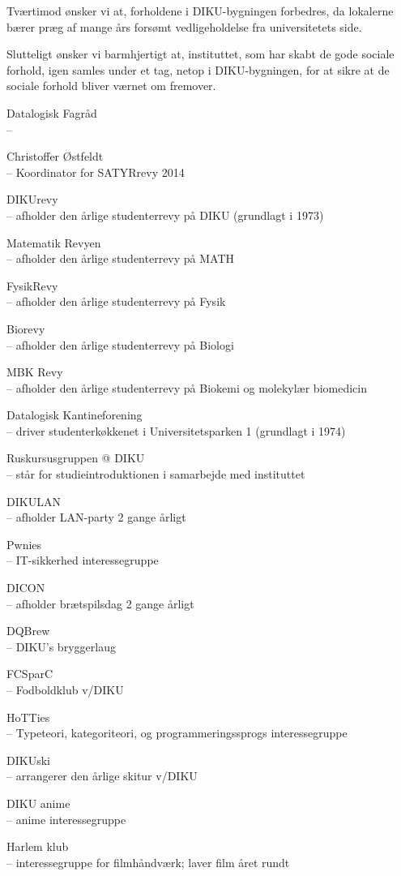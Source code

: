 \documentclass[a4paper]{article}
\begin{document}
Tværtimod ønsker vi at, forholdene i DIKU-bygningen forbedres, da
lokalerne bærer præg af mange års forsømt vedligeholdelse fra
universitetets side.

Slutteligt ønsker vi barmhjertigt at, instituttet, som har skabt de gode
sociale forhold, igen samles under et tag, netop i DIKU-bygningen, for at sikre
at de sociale forhold bliver værnet om fremover.

\begin{flushright}

\footnotesize\sffamily\itshape

Datalogisk Fagråd \\
--

Christoffer Østfeldt \\
-- Koordinator for SATYRrevy 2014

DIKUrevy \\
-- afholder den årlige studenterrevy på DIKU (grundlagt i 1973)

Matematik Revyen \\
-- afholder den årlige studenterrevy på MATH

FysikRevy \\
-- afholder den årlige studenterrevy på Fysik

Biorevy \\
-- afholder den årlige studenterrevy på Biologi

MBK Revy \\
-- afholder den årlige studenterrevy på Biokemi og molekylær biomedicin

Datalogisk Kantineforening \\
-- driver studenterkøkkenet i Universitetsparken 1 (grundlagt i 1974)

Ruskursusgruppen @ DIKU \\
-- står for studieintroduktionen i samarbejde med instituttet

DIKULAN \\
-- afholder LAN-party 2 gange årligt

Pwnies \\
-- IT-sikkerhed interessegruppe

DICON \\
-- afholder brætspilsdag 2 gange årligt

DQBrew \\
-- DIKU's bryggerlaug

FCSparC \\
-- Fodboldklub v/DIKU

HoTTies \\
-- Typeteori, kategoriteori, og programmeringssprogs interessegruppe

DIKUski \\
-- arrangerer den årlige skitur v/DIKU

DIKU anime \\
-- anime interessegruppe

Harlem klub \\
-- interessegruppe for filmhåndværk;  laver film året rundt

\end{flushright}
\end{document}
